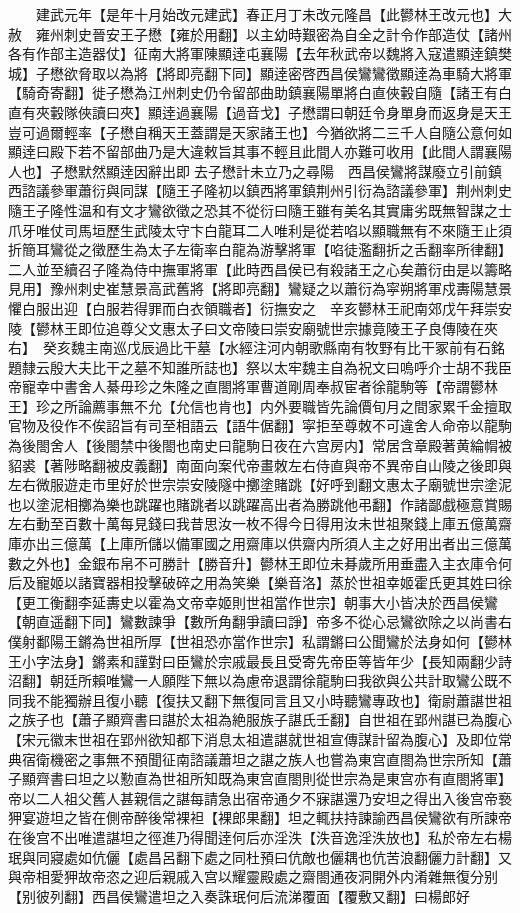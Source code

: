 　　建武元年【是年十月始改元建武】春正月丁未改元隆昌【此鬰林王改元也】大赦　雍州刺史晉安王子懋【雍於用翻】以主幼時艱密為自全之計令作部造仗【諸州各有作部主造器仗】征南大將軍陳顯逹屯襄陽【去年秋武帝以魏將入寇遣顯逹鎮樊城】子懋欲脅取以為將【將即亮翻下同】顯逹密啓西昌侯鸞鸞徵顯逹為車騎大將軍【騎奇寄翻】徙子懋為江州刺史仍令留部曲助鎮襄陽單將白直俠轂自隨【諸王有白直有夾轂隊俠讀曰夾】顯逹過襄陽【過音戈】子懋謂曰朝廷令身單身而返身是天王豈可過爾輕率【子懋自稱天王蓋謂是天家諸王也】今猶欲將二三千人自隨公意何如顯逹曰殿下若不留部曲乃是大違敕旨其事不輕且此間人亦難可收用【此間人謂襄陽人也】子懋默然顯逹因辭出即去子懋計未立乃之尋陽　西昌侯鸞將謀廢立引前鎮西諮議參軍蕭衍與同謀【隨王子隆初以鎮西將軍鎮荆州引衍為諮議參軍】荆州刺史隨王子隆性温和有文才鸞欲徵之恐其不從衍曰隨王雖有美名其實庸劣既無智謀之士爪牙唯仗司馬垣歷生武陵太守卞白龍耳二人唯利是從若啗以顯職無有不來隨王止須折簡耳鸞從之徵歷生為太子左衛率白龍為游擊將軍【啗徒濫翻折之舌翻率所律翻】二人並至續召子隆為侍中撫軍將軍【此時西昌侯已有殺諸王之心矣蕭衍由是以籌略見用】豫州刺史崔慧景高武舊將【將即亮翻】鸞疑之以蕭衍為寜朔將軍戍夀陽慧景懼白服出迎【白服若得罪而白衣領職者】衍撫安之　辛亥鬰林王祀南郊戊午拜崇安陵【鬰林王即位追尊父文惠太子曰文帝陵曰崇安廟號世宗據竟陵王子良傳陵在夾右】　癸亥魏主南巡戊辰過比干墓【水經注河内朝歌縣南有牧野有比干冢前有石銘題隸云殷大夫比干之墓不知誰所誌也】祭以太牢魏主自為祝文曰嗚呼介士胡不我臣　帝寵幸中書舍人綦毋珍之朱隆之直閤將軍曹道剛周奉叔宦者徐龍駒等【帝謂鬰林王】珍之所論薦事無不允【允信也肯也】内外要職皆先論價旬月之間家累千金擅取官物及役作不俟詔旨有司至相語云【語牛倨翻】寜拒至尊敇不可違舍人命帝以龍駒為後閤舍人【後閤禁中後閤也南史曰龍駒日夜在六宫房内】常居含章殿著黄綸㡌被貂裘【著陟略翻被皮義翻】南面向案代帝畫敇左右侍直與帝不異帝自山陵之後即與左右微服遊走市里好於世宗崇安陵隧中擲塗賭跳【好呼到翻文惠太子廟號世宗塗泥也以塗泥相擲為樂也跳躍也賭跳者以跳躍高出者為勝跳他弔翻】作諸鄙戲極意賞賜左右動至百數十萬每見錢曰我昔思汝一枚不得今日得用汝未世祖聚錢上庫五億萬齋庫亦出三億萬【上庫所儲以備軍國之用齋庫以供齋内所須人主之好用出者出三億萬數之外也】金銀布帛不可勝計【勝音升】鬰林王即位未朞歲所用垂盡入主衣庫令何后及寵姬以諸寶器相投擊破碎之用為笑樂【樂音洛】蒸於世祖幸姬霍氏更其姓曰徐【更工衡翻李延夀史以霍為文帝幸姬則世祖當作世宗】朝事大小皆决於西昌侯鸞【朝直遥翻下同】鸞數諫爭【數所角翻爭讀曰諍】帝多不從心忌鸞欲除之以尚書右僕射鄱陽王鏘為世祖所厚【世祖恐亦當作世宗】私謂鏘曰公聞鸞於法身如何【鬰林王小字法身】鏘素和謹對曰臣鸞於宗戚最長且受寄先帝臣等皆年少【長知兩翻少詩沼翻】朝廷所賴唯鸞一人願陛下無以為慮帝退謂徐龍駒曰我欲與公共計取鸞公既不同我不能獨辦且復小聽【復扶又翻下無復同言且又小時聽鸞專政也】衛尉蕭諶世祖之族子也【蕭子顯齊書曰諶於太祖為絶服族子諶氏壬翻】自世祖在郢州諶已為腹心【宋元徽末世祖在郢州欲知都下消息太祖遣諶就世祖宣傳謀計留為腹心】及即位常典宿衛機密之事無不預聞征南諮議蕭坦之諶之族人也嘗為東宫直閤為世宗所知【蕭子顯齊書曰坦之以懃直為世祖所知既為東宫直閤則從世宗為是東宫亦有直閤將軍】帝以二人祖父舊人甚親信之諶每請急出宿帝通夕不寐諶還乃安坦之得出入後宫帝䙝狎宴遊坦之皆在側帝醉後常裸袒【裸郎果翻】坦之輒扶持諫諭西昌侯鸞欲有所諫帝在後宫不出唯遣諶坦之徑進乃得聞逹何后亦淫泆【泆音逸淫泆放也】私於帝左右楊珉與同寢處如伉儷【處昌呂翻下處之同杜預曰伉敵也儷耦也伉苦浪翻儷力計翻】又與帝相愛狎故帝恣之迎后親戚入宫以耀靈殿處之齋閤通夜洞開外内淆雜無復分别【别彼列翻】西昌侯鸞遣坦之入奏誅珉何后流涕覆面【覆敷又翻】曰楊郎好